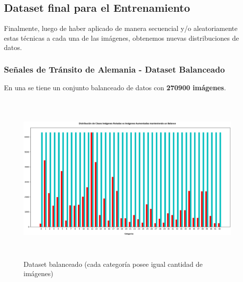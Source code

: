 	\newpage
	\subsection{Dataset final para el Entrenamiento}
		Finalmente, luego de haber aplicado de manera secuencial y/o aleatoriamente estas técnicas a cada una de las imágenes, obtenemos nuevas distribuciones de datos. 
		\subsubsection{Señales de Tránsito de Alemania - Dataset Balanceado }
			En una se tiene un conjunto balanceado de datos con {\bf 270900 imágenes}.
			\begin{figure}[H]
				\includegraphics[width=1\textwidth, height=8.5cm]{images/desarrollo/histograms/train_extended_balanced270900}
				\begin{center}
				\caption{\small{Dataset balanceado (cada categoría posee igual cantidad de imágenes)}}
				{\small{\fontsize{10}{16.8}\selectfont {Fuente: Elaboración propia}}}
				\end{center}

			\end{figure}

